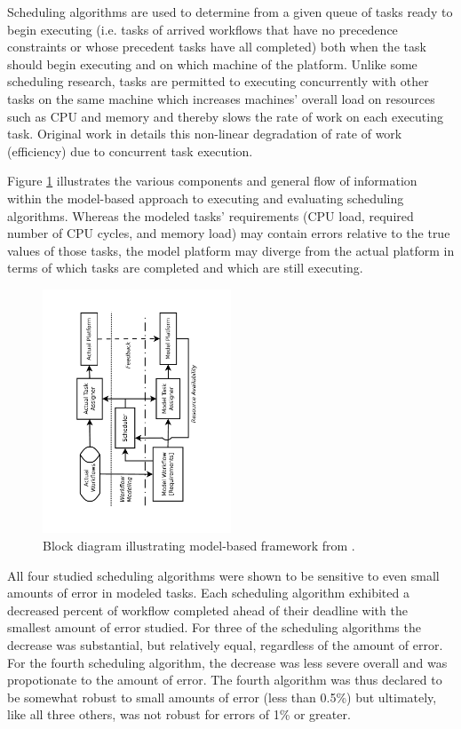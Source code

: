 \documentclass[10pt]{csce}
\begin{document}
Scheduling algorithms are used to determine from a given queue of tasks
ready to begin executing (i.e. tasks of arrived workflows that have no
precedence constraints or whose precedent tasks have all completed) both
when the task should begin executing and on which machine of the platform.
Unlike some scheduling research, tasks are permitted to executing concurrently
with other tasks on the same machine which increases machines' overall load
on resources such as CPU and memory and thereby slows the rate of work on each
executing task.  Original work in \cite{pdpta09} details this non-linear
degradation of rate of work (efficiency) due to concurrent task execution.

Figure \ref{fig:platform} illustrates the various components and general
flow of information within the model-based approach to executing and evaluating
scheduling algorithms.  Whereas the modeled tasks' requirements (CPU load,
required number of CPU cycles, and memory load) may contain errors relative to
the true values of those tasks, the model platform may diverge from the
actual platform in terms of which tasks are completed and which are still
executing.

\begin{figure}
	\begin{center}
		\includegraphics[angle=-90,width=0.5\textwidth]{figures/PlatformDiagram.pdf}
	\end{center}
	\caption{Block diagram illustrating model-based framework from
		\cite{pdpta18}.}
	\label{fig:platform}
\end{figure}

All four studied scheduling algorithms were shown to be sensitive to
even small amounts of error in modeled tasks.  Each scheduling algorithm
exhibited a decreased percent of workflow completed ahead of their deadline
with the smallest amount of error studied.  For three of the scheduling
algorithms the decrease was substantial, but relatively equal, regardless of
the amount of error.  For the fourth scheduling algorithm, the decrease was
less severe overall and was propotionate to the amount of error.  The
fourth algorithm was thus declared to be somewhat robust to small amounts of
error (less than 0.5\%) but ultimately, like all three others, was not
robust for errors of 1\% or greater.
\end{document}
